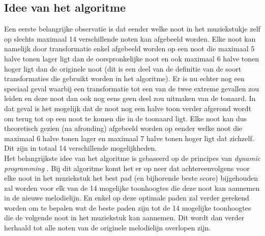 \subsection{Idee van het algoritme}
Een eerste belangrijke observatie is dat eender welke noot in het muziekstukje zelf op slechts maximaal 14 verschillende noten kan afgebeeld worden. Elke noot kan namelijk door transformatie enkel afgebeeld worden op een noot die maximaal 5 halve tonen lager ligt dan de oorspronkelijke noot en ook maximaal 6 halve tonen hoger ligt dan de originele noot (dit is een deel van de definitie van de soort transformaties die gebruikt worden in het algoritme). Er is nu echter nog een speciaal geval waarbij een transformatie tot een van de twee extreme gevallen zou leiden en deze noot dan ook nog eens geen deel zou uitmaken van de tonaard. In dat geval is het mogelijk dat de noot nog een halve toon verder afgerond wordt om terug tot op een noot te komen die in de toonaard ligt. Elke noot kan dus theoretisch gezien (na afronding) afgebeeld worden op eender welke noot die maximaal 6 halve tonen lager en maximaal 7 halve tonen hoger ligt dat zichzelf. Dit zijn in totaal 14 verschillende mogelijkheden.\\
Het belangrijkste idee van het algoritme is gebaseerd op de principes van \textit{dynamic programming} \cite{url:DP}. Bij dit algoritme komt het er op neer dat achtereenvolgens voor elke noot in het muziekstuk het best pad (en bijhorende beste score) bijgehouden zal worden voor elk van de 14 mogelijke toonhoogtes die deze noot kan aannemen in de nieuwe melodielijn. En enkel op deze optimale paden zal verder gerekend worden om te bepalen wat de beste paden zijn tot de 14 mogelijke toonhoogtes die de volgende noot in het muziekstuk kan aannemen. Dit wordt dan verder herhaald tot alle noten van de originele melodielijn overlopen zijn.

